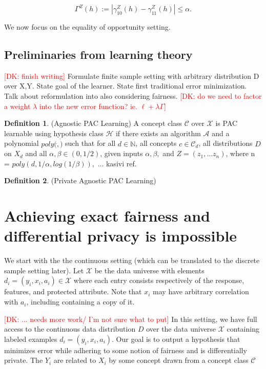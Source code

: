 \documentclass[format = sigconf]{acmart}
\newcommand{\dk}[1]{\textcolor{red}{[DK: #1]}}
\newcommand{\A}{\mathcal{A}}
\renewcommand{\H}{\mathcal{H}}
\renewcommand{\C}{\mathcal{C}}
\newcommand{\X}{\mathcal{X}}
\newcommand{\1}{\mathbbm{1}}
\theoremstyle{definition}
\newtheorem{defn}{Definition}[section]
\begin{document}
$$\Gamma^Z(h) := |\gamma_{10}^Z(h) - \gamma_{11}^Z(h)| \leq \alpha.$$

We now focus on the equality of opportunity setting.
\subsection{Preliminaries from learning theory}
\dk {finish writing}
Formulate finite sample setting with arbitrary distribution D over X,Y. State goal of the learner. State first traditional error minimization. Talk about reformulation into also considering fairness. \dk {do we need to factor a weight $\lambda$ into the new error function? ie. $\ell + \lambda \Gamma$}

\begin{defn}
	(Agnostic PAC Learning) A concept class $\mathcal{C}$ over $\X$ is PAC learnable using hypothesis class $\H$ if there exists an algorithm $\A$ and a polynomial $poly(\dot,\dot)$ such that for all $d \in \mathbb{N}$, all concepts $c \in \mathcal{C}_d$, all distributions $D$ on $X_d$ and all $\alpha,\beta \in (0,1/2)$, given inputs $\alpha,\beta,$ and $Z = (z_1, ... z_n)$, where n = $poly(d, 1/\alpha, log(1/\beta)),$ ... kasivi ref.

\end{defn}
\begin{defn}
	(Private Agnostic PAC Learning)
\end{defn}

\section{Achieving exact fairness and differential privacy is impossible}
We start with the the continuous setting (which can be translated to the discrete sample setting later). Let $\mathcal{X}$ be the data universe with elements $d_i = (y_i,x_i,a_i) \in \mathcal{X}$ where each entry consists respectively of the response, features, and protected attribute. Note that $x_i$ may have arbitrary correlation with $a_i$, including containing a copy of it.

\dk {... needs more work/ I'm not sure what to put}
In this setting, we have full access to the continuous data distribution $D$ over the data universe $\X$ containing labeled examples $d_i = (y_i,x_i,a_i)$. Our goal is to output a hypothesis that minimizes error while adhering to some notion of fairness and is differentially private. The $Y_i$ are related to $X_i$ by some concept drawn from a concept class $\C$
\end{document}

